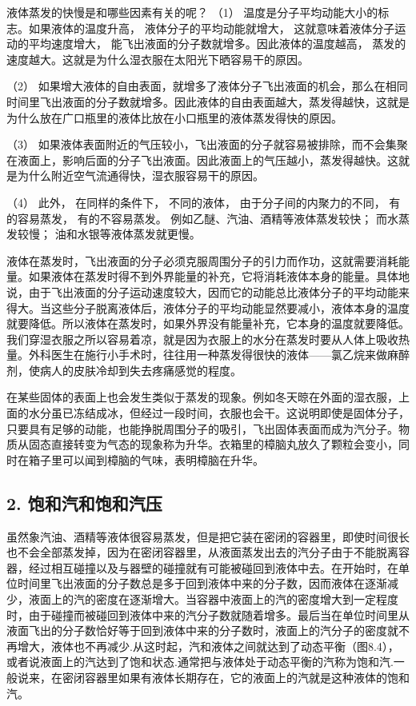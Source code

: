 液体蒸发的快慢是和哪些因素有关的呢？ （1）
温度是分子平均动能大小的标志。如果液体的温度升高，
液体分子的平均动能就增大， 这就意味着液体分子运动的平均速度增大，
能飞出液面的分子数就增多。因此液体的温度越高，
蒸发的速度越大。这就是为什么湿衣服在太阳光下晒容易干的原因。

（2）
如果增大液体的自由表面，就增多了液体分子飞出液面的机会，那么在相同时间里飞出液面的分子数就增多。因此液体的自由表面越大，蒸发得越快，这就是为什么放在广口瓶里的液体比放在小口瓶里的液体蒸发得快的原因。

（3）
如果液体表面附近的气压较小，飞出液面的分子就容易被排除，而不会集聚在液面上，影响后面的分子飞出液面。因此液面上的气压越小，蒸发得越快。这就是为什么附近空气流通得快，湿衣服容易干的原因。

（4） 此外， 在同样的条件下， 不同的液体， 由于分子间的内聚力的不同，
有的容易蒸发， 有的不容易蒸发。 例如乙醚、汽油、酒精等液体蒸发较快；
而水蒸发较慢； 油和水银等液体蒸发就更慢。

液体在蒸发时，飞出液面的分子必须克服周围分子的引力而作功，这就需要消耗能量。如果液体在蒸发时得不到外界能量的补充，它将消耗液体本身的能量。具体地说，由于飞出液面的分子运动速度较大，因而它的动能总比液体分子的平均动能来得大。当这些分子脱离液体后，液体分子的平均动能显然要减小，液体本身的温度就要降低。所以液体在蒸发时，如果外界没有能量补充，它本身的温度就要降低。我们穿湿衣服之所以容易着凉，就是因为衣服上的水分在蒸发时要从人体上吸收热量。外科医生在施行小手术时，往往用一种蒸发得很快的液体------氯乙烷来做麻醉剂，使病人的皮肤冷却到失去疼痛感觉的程度。

在某些固体的表面上也会发生类似于蒸发的现象。例如冬天晾在外面的湿衣服，上面的水分虽已冻结成冰，但经过一段时间，衣服也会干。这说明即使是固体分子，只要具有足够的动能，也能挣脱周围分子的吸引，飞出固体表面而成为汽分子。物质从固态直接转变为气态的现象称为升华。衣箱里的樟脑丸放久了颗粒会变小，同时在箱子里可以闻到樟脑的气味，表明樟脑在升华。

\subsection{2.
饱和汽和饱和汽压}\label{ux9971ux548cux6c7dux548cux9971ux548cux6c7dux538b}

虽然象汽油、酒精等液体很容易蒸发，但是把它装在密闭的容器里，即使时间很长也不会全部蒸发掉，因为在密闭容器里，从液面蒸发出去的汽分子由于不能脱离容器，经过相互碰撞以及与器壁的碰撞就有可能被碰回到液体中去。在开始时，在单位时间里飞出液面的分子数总是多于回到液体中来的分子数，因而液体在逐渐减少，液面上的汽的密度在逐渐增大。当容器中液面上的汽的密度增大到一定程度时，由于碰撞而被碰回到液体中来的汽分子数就随着增多。最后当在单位时间里从液面飞出的分子数恰好等于回到液体中来的分子数时，液面上的汽分子的密度就不再增大，液体也不再减少.从这时起，汽和液体之间就达到了动态平衡（图8.4），或者说液面上的汽达到了饱和状态.通常把与液体处于动态平衡的汽称为饱和汽.一般说来，在密闭容器里如果有液体长期存在，它的液面上的汽就是这种液体的饱和汽。

